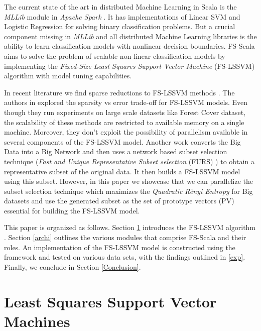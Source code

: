 \documentclass[conference, cmex10]{IEEEtran}
\begin{document}
The current state of the art in distributed Machine Learning in Scala is the \textit{MLLib} module in \textit{Apache Spark} \cite{Meng}. It has implementations of Linear SVM and Logistic Regression for solving binary classification problems. But a crucial component missing in \textit{MLLib} and all distributed Machine Learning libraries is the ability to learn classification models with nonlinear decision boundaries. FS-Scala aims to solve the problem of scalable non-linear classification models by implementing the \textit{Fixed-Size Least Squares Support Vector Machine} (FS-LSSVM) algorithm \cite{DeBrabanter2010,Suykens2002} with model tuning capabilities.  

In recent literature we find sparse reductions to FS-LSSVM methods \cite{Mall2015,Mall2013}. The authors in \cite{Mall2015,Mall2013} explored the sparsity vs error trade-off for FS-LSSVM models. Even though they run experiments on large scale datasets like Forest Cover dataset, the scalability of these methods are restricted to available memory on a single machine. Moreover, they don't exploit the possibility of parallelism available in several components of the FS-LSSVM model. Another work \cite{Mall2014} converts the Big Data into a Big Network and then uses a network based subset selection technique (\textit{Fast and Unique Representative Subset selection} (FURS) \cite{Mall2013FURS}) to obtain a representative subset of the original data. It then builds a FS-LSSVM model using this subset. However, in this paper we showcase that we can parallelize the subset selection technique which maximizes the \textit{Quadratic R\`enyi Entropy} for Big datasets and use the generated subset as the set of prototype vectors (PV) essential for building the FS-LSSVM model.

This paper is organized as follows. Section \ref{LSSVM} introduces the FS-LSSVM algorithm \cite{DeBrabanter2010}. Section \ref{archi} outlines the various modules that comprise FS-Scala and their roles. An implementation of the FS-LSSVM model is constructed using the framework and tested on various data sets, with the findings outlined in \ref{exp}. Finally, we conclude in Section \ref{Conclusion}.
\section{Least Squares Support Vector Machines} \label{LSSVM}
\end{document}
